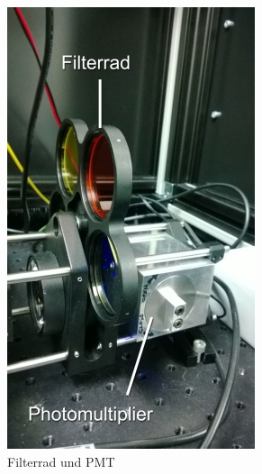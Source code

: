 \begin{figure}
\begin{minipage}[b]{0.4\linewidth}
\includegraphics[width=0.8\linewidth]{IMAGE/pmt.png}
	\caption{Filterrad und PMT}
	\label{fig:pmt}
\end{minipage}

\end{figure}
 
